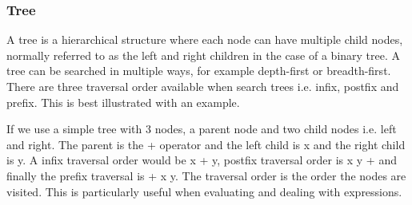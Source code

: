 \subsubsection{Tree}

A tree is a hierarchical structure where each node can have multiple child nodes, normally referred to as the left and right children in the case of a binary tree. A tree can be searched in multiple ways, for example depth-first or breadth-first. There are three traversal order available when search trees i.e. infix, postfix and prefix. This is best illustrated with an example. 

If we use a simple tree with 3 nodes, a parent node and two child nodes i.e. left and right. The parent is the + operator and the left child is x and the right child is y. A infix traversal order would be x + y, postfix traversal order is x y + and finally the prefix traversal is + x y. The traversal order is the order the nodes are visited. This is particularly useful when evaluating and dealing with expressions.

